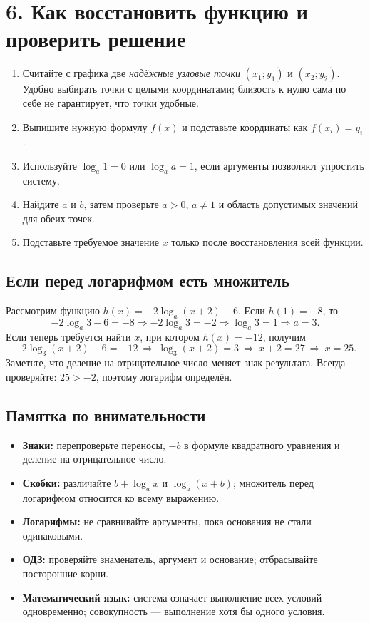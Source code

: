 \documentclass[a4paper,12pt]{article}
\begin{document}
\section*{6. Как восстановить функцию и проверить решение}
\begin{enumerate}
\item Считайте с графика две \emph{надёжные узловые точки} $(x_1;y_1)$ и $(x_2;y_2)$. Удобно выбирать точки с целыми координатами; близость к нулю сама по себе не гарантирует, что точки удобные.
\item Выпишите нужную формулу $f(x)$ и подставьте координаты как $f(x_i)=y_i$.
\item Используйте $\log_a1=0$ или $\log_a a=1$, если аргументы позволяют упростить систему.
\item Найдите $a$ и $b$, затем проверьте $a>0$, $a\ne1$ и область допустимых значений для обеих точек.
\item Подставьте требуемое значение $x$ только после восстановления всей функции.
\end{enumerate}
\subsection*{Если перед логарифмом есть множитель}
Рассмотрим функцию $h(x)=-2\log_a(x+2)-6$. Если $h(1)=-8$, то
\[
-2\log_a3-6=-8\Rightarrow -2\log_a3=-2\Rightarrow\log_a3=1
\Rightarrow a=3.
\]
Если теперь требуется найти $x$, при котором $h(x)=-12$, получим
\[
-2\log_3(x+2)-6=-12\ \Longrightarrow\ \log_3(x+2)=3
\ \Longrightarrow\ x+2=27\ \Longrightarrow\ \boxed{x=25}.
\]
Заметьте, что деление на отрицательное число меняет знак результата. Всегда проверяйте: $25>-2$, поэтому логарифм определён.
\subsection*{Памятка по внимательности}
\begin{itemize}
\item \textbf{Знаки:} перепроверьте переносы, $-b$ в формуле квадратного уравнения и деление на отрицательное число.
\item \textbf{Скобки:} различайте $b+\log_ax$ и $\log_a(x+b)$; множитель перед логарифмом относится ко всему выражению.
\item \textbf{Логарифмы:} не сравнивайте аргументы, пока основания не стали одинаковыми.
\item \textbf{ОДЗ:} проверяйте знаменатель, аргумент и основание; отбрасывайте посторонние корни.
\item \textbf{Математический язык:} система означает выполнение всех условий одновременно; совокупность --- выполнение хотя бы одного условия.
\end{itemize}
\end{document}
